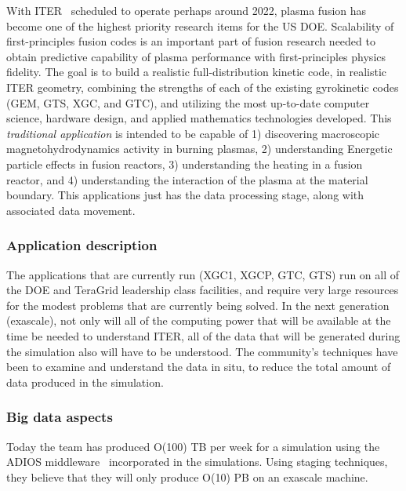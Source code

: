 With ITER~\cite{iter} scheduled to operate perhaps around 2022, plasma fusion has become
one of the highest priority research items for the US DOE. Scalability of
first-principles fusion codes is an important part of fusion research
needed to obtain predictive capability of plasma performance with
first-principles physics fidelity. The goal is to build a realistic
full-distribution kinetic code, in realistic ITER geometry, combining
the strengths of each of the existing gyrokinetic codes (GEM, GTS,
XGC, and GTC), and utilizing the most up-to-date computer science,
hardware design, and applied mathematics technologies developed. This
{\em traditional application} is intended to be capable of 1) discovering
macroscopic magnetohydrodynamics activity in burning plasmas, 2)
understanding Energetic particle effects in fusion reactors, 3)
understanding the heating in a fusion reactor, and 4) understanding the
interaction of the plasma at the material boundary. This applications just
has the data processing stage, along with associated data movement.

\subsubsection*{Application description}


The applications that are currently run (XGC1, XGCP, GTC, GTS) run on all of the DOE and TeraGrid leadership class facilities, and require very large resources for the modest problems that are currently being solved. In the next generation (exascale), not only will all of the computing power that will be available at the time be needed to understand ITER, all of the data that will be generated during the simulation also will have to be understood. The community's techniques have been to examine and understand the data in situ, to reduce the total amount of data produced in the simulation.


 \subsubsection*{Big data aspects}



Today the team has produced O(100) TB per week for a simulation using the ADIOS middleware~\cite{adios} incorporated in the simulations. Using staging techniques, they believe that they will only produce O(10) PB on an exascale machine.

